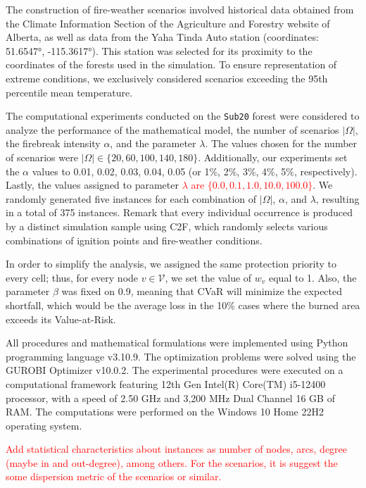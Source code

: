 \documentclass[a4paper,fleqn]{cas-sc}
\begin{document}
The construction of fire-weather scenarios involved historical data obtained from the Climate Information Section of the Agriculture and Forestry website of Alberta, as well as data from the Yaha Tinda Auto station (coordinates: 51.6547°, -115.3617°). This station was selected for its proximity to the coordinates of the forests used in the simulation. To ensure representation of extreme conditions, we exclusively considered scenarios exceeding the 95th percentile mean temperature.

The computational experiments conducted on the \texttt{Sub20} forest were considered to analyze the performance of the mathematical model, the number of scenarios $|\Omega|$, the firebreak intensity $\alpha$, and the parameter $\lambda$. The values chosen for the number of scenarios were $|\Omega| \in \{ 20, 60, 100, 140, 180 \}$. Additionally, our experiments set the $\alpha$ values to 0.01, 0.02, 0.03, 0.04, 0.05 (or 1\%, 2\%, 3\%, 4\%, 5\%, respectively). Lastly, the values assigned to parameter \textcolor{red}{$\lambda$ are $ \{0.0, 0.1, 1.0,10.0,100.0 \}$}. We randomly generated five instances for each combination of $|\Omega|$, $\alpha$, and $\lambda$, resulting in a total of 375 instances. Remark that every individual occurrence is produced by a distinct simulation sample using C2F, which randomly selects various combinations of ignition points and fire-weather conditions.

In order to simplify the analysis, we assigned the same protection priority to every cell; thus, for every node $v \in \mathcal{V}$, we set the value of $w_v$ equal to 1. Also, the parameter $\beta$ was fixed on 0.9, meaning that CVaR will minimize the expected shortfall, which would be the average loss in the 10\% cases where the burned area exceeds its Value-at-Risk.

All procedures and mathematical formulations were implemented using Python programming language v3.10.9. The optimization problems were solved using the GUROBI Optimizer v10.0.2. The experimental procedures were executed on a computational framework featuring 12th Gen Intel(R) Core(TM) i5-12400 processor, with a speed of 2.50 GHz and 3,200 MHz Dual Channel 16 GB of RAM. The computations were performed on the Windows 10 Home 22H2 operating system.

\textcolor{red}{Add statistical characteristics about instances as number of nodes, arcs, degree (maybe in and out-degree), among others. For the scenarios, it is suggest the some dispersion metric of the scenarios or similar.}
\end{document}
